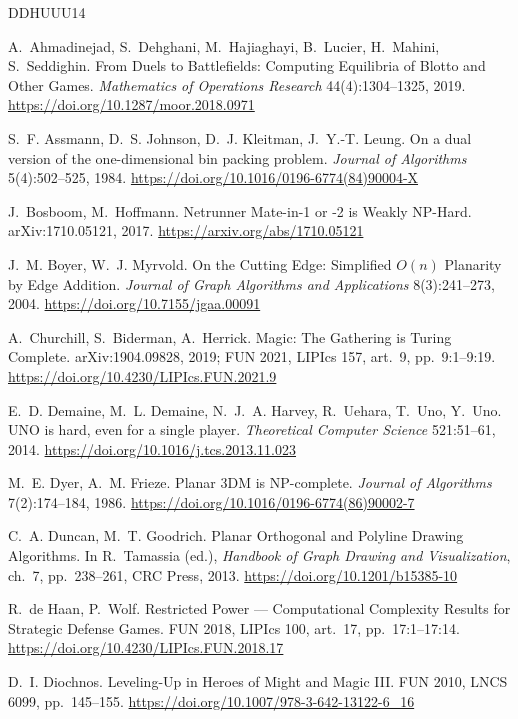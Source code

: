 \documentclass[11pt,a4paper]{article}
\theoremstyle{plain}
\theoremstyle{definition}
\theoremstyle{plain}
\theoremstyle{definition}
\theoremstyle{remark}
\begin{document}
\begin{thebibliography}{DDHUUU14}

 A.~Ahmadinejad, S.~Dehghani, M.~Hajiaghayi, B.~Lucier, H.~Mahini,
S.~Seddighin. From Duels to Battlefields: Computing Equilibria of Blotto and Other Games.
\emph{Mathematics of Operations Research} 44(4):1304--1325, 2019.
\url{https://doi.org/10.1287/moor.2018.0971}

 S.~F. Assmann, D.~S. Johnson, D.~J. Kleitman, J.~Y.-T. Leung.
On a dual version of the one-dimensional bin packing problem.
\emph{Journal of Algorithms} 5(4):502--525, 1984.
\url{https://doi.org/10.1016/0196-6774(84)90004-X}

 J.~Bosboom, M.~Hoffmann. Netrunner Mate-in-1 or -2 is Weakly NP-Hard.
arXiv:1710.05121, 2017. \url{https://arxiv.org/abs/1710.05121}

 J.~M. Boyer, W.~J. Myrvold. On the Cutting Edge: Simplified $O(n)$ Planarity
by Edge Addition. \emph{Journal of Graph Algorithms and Applications} 8(3):241--273, 2004.
\url{https://doi.org/10.7155/jgaa.00091}

 A.~Churchill, S.~Biderman, A.~Herrick. Magic: The Gathering is Turing
Complete. arXiv:1904.09828, 2019; FUN 2021, LIPIcs 157, art.~9, pp.~9:1--9:19.
\url{https://doi.org/10.4230/LIPIcs.FUN.2021.9}

 E.~D. Demaine, M.~L. Demaine, N.~J.~A. Harvey, R.~Uehara, T.~Uno,
Y.~Uno. UNO is hard, even for a single player. \emph{Theoretical Computer Science}
521:51--61, 2014. \url{https://doi.org/10.1016/j.tcs.2013.11.023}

 M.~E. Dyer, A.~M. Frieze. Planar 3DM is NP-complete.
\emph{Journal of Algorithms} 7(2):174--184, 1986.
\url{https://doi.org/10.1016/0196-6774(86)90002-7}

 C.~A. Duncan, M.~T. Goodrich. Planar Orthogonal and Polyline Drawing
Algorithms. In R.~Tamassia (ed.), \emph{Handbook of Graph Drawing and Visualization}, ch.~7,
pp.~238--261, CRC Press, 2013. \url{https://doi.org/10.1201/b15385-10}

 R.~de Haan, P.~Wolf. Restricted Power --- Computational Complexity Results
for Strategic Defense Games. FUN 2018, LIPIcs 100, art.~17, pp.~17:1--17:14.
\url{https://doi.org/10.4230/LIPIcs.FUN.2018.17}

 D.~I. Diochnos. Leveling-Up in Heroes of Might and Magic III.
FUN 2010, LNCS 6099, pp.~145--155. \url{https://doi.org/10.1007/978-3-642-13122-6_16}


\end{thebibliography}
\end{document}
